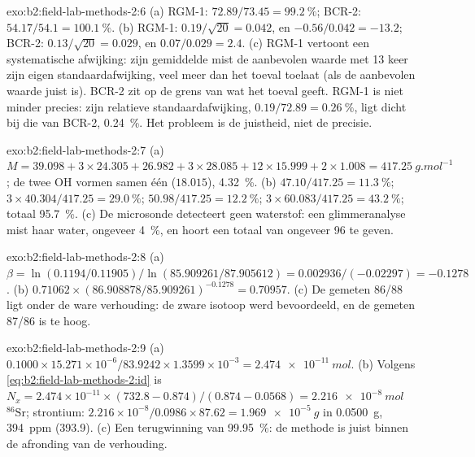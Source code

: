 \begin{solution}{exo:b2:field-lab-methods-2:6}
(a) RGM-1: $72.89/73.45 = \qty{99.2}{\percent}$; BCR-2: $54.17/54.1 = \qty{100.1}{\percent}$.
(b) RGM-1: $0.19/\sqrt{20} = 0.042$, en $-0.56/0.042 = -13.2$; BCR-2: $0.13/\sqrt{20} = 0.029$, en
$0.07/0.029 = 2.4$. (c) RGM-1 vertoont een systematische afwijking: zijn gemiddelde mist de aanbevolen waarde met 13 keer zijn eigen
standaardafwijking, veel meer dan het toeval toelaat (als de aanbevolen waarde juist is). BCR-2 zit op
de grens van wat het toeval geeft. RGM-1 is niet minder precies: zijn relatieve standaardafwijking,
$0.19/72.89 = \qty{0.26}{\percent}$, ligt dicht bij die van BCR-2, \qty{0.24}{\percent}. Het probleem is
de juistheid, niet de precisie.
\end{solution}

\begin{solution}{exo:b2:field-lab-methods-2:7}
(a) $M = 39.098 + 3 \times 24.305 + 26.982 + 3 \times 28.085 + 12 \times 15.999 + 2 \times 1.008 =
\qty{417.25}{g.mol^{-1}}$; de twee OH vormen samen één  ($18.015$), \qty{4.32}{\percent}.
(b)  $47.10/417.25 = \qty{11.3}{\percent}$;  $3 \times 40.304/417.25 =
\qty{29.0}{\percent}$;  $50.98/417.25 = \qty{12.2}{\percent}$;  $3 \times
60.083/417.25 = \qty{43.2}{\percent}$; totaal \qty{95.7}{\percent}. (c) De microsonde detecteert
geen waterstof: een glimmeranalyse mist haar water, ongeveer \qty{4}{\percent}, en hoort een totaal van ongeveer
96 te geven.
\end{solution}

\begin{solution}{exo:b2:field-lab-methods-2:8}
(a) $\beta = \ln(0.1194/0.11905)/\ln(85.909261/87.905612) = 0.002936/(-0.02297) = -0.1278$.
(b) $0.71062 \times (86.908878/85.909261)^{-0.1278} = 0.70957$. (c) De gemeten 86/88 ligt onder de
ware verhouding: de zware isotoop werd bevoordeeld, en de gemeten 87/86 is te hoog.
\end{solution}

\begin{solution}{exo:b2:field-lab-methods-2:9}
(a) $0.1000 \times 15.271 \times 10^{-6}/83.9242 \times 1.3599 \times 10^{-3} = \qty{2.474e-11}{mol}$.
(b) Volgens \eqref{eq:b2:field-lab-methods-2:id} is $N_x = 2.474 \times 10^{-11} \times (732.8 -
0.874)/(0.874 - 0.0568) = \qty{2.216e-8}{mol}$ $^{86}\mathrm{Sr}$; strontium: $2.216 \times
10^{-8}/0.0986 \times 87.62 = \qty{1.969e-5}{g}$ in \qty{0.0500}{g}, \qty{394}{ppm} (393.9).
(c) Een terugwinning van \qty{99.95}{\percent}: de methode is juist binnen de afronding van de verhouding.
\end{solution}

